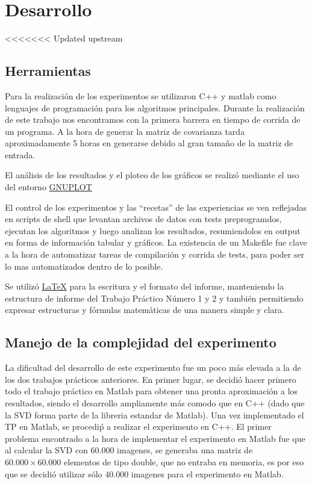 \section{Desarrollo}
<<<<<<< Updated upstream

\subsection{Herramientas}

Para la realizaci\'on de los experimentos se utilizaron C++ y matlab como lenguajes de
programaci\'on para los algoritmos principales. Durante la realizaci\'on de este trabajo nos encontramos con 
la primera barrera en tiempo de corrida de un programa. A la hora de generar la matriz de covarianza tarda
aproximadamente 5 horas en generarse debido al gran tama\~no de la matriz de entrada. 

El an\'alisis de los resultados y el ploteo de los gr\'aficos se realiz\'o
mediante el uso del entorno \href{http://www.gnuplot.info/}{GNUPLOT}

El control de los experimentos y las ``recetas'' de las experiencias se ven
reflejadas en scripts de shell que levantan archivos de datos con tests
preprogramdos, ejecutan los algoritmos y luego analizan los resultados,
resumiendolos en output en forma de informaci\'on tabular y gr\'aficos.
La existencia de un Makefile fue clave a la hora de automatizar tareas de
compilaci\'on y corrida de tests, para poder ser lo mas automatizados dentro de
lo posible.

Se utiliz\'o \href{http://www.latex-project.org/}{LaTeX} para la escritura y el formato del informe,
 manteniendo la estructura de informe del Trabajo Pr\'actico N\'umero 1 y 2 y tambi\'en
permitiendo expresar estructuras y f\'ormulas matem\'aticas de una manera simple y clara.

\subsection{Manejo de la complejidad del experimento}

La dificultad del desarrollo de este experimento fue un poco m\'as elevada a la de los dos 
trabajos pr\'acticos anteriores. 
En primer lugar, se decidi\'o hacer primero todo el trabajo pr\'actico en Matlab para obtener
una pronta aproximaci\'on a los resultados, siendo el desarrollo ampliamente m\'as comodo que
en C++ (dado que la SVD forma parte de la libreria estandar de Matlab). Una vez implementado
el TP en Matlab, se procedi\'p a realizar el experimento en C++. El primer problema encontrado
a la hora de implementar el experimento en Matlab fue que al calcular la SVD con 60.000 imagenes,
se generaba una matriz de $60.000 \times 60.000$ elementos de tipo double, que no entraba en
memoria, es por eso que se decidi\'o utilizar s\'olo 40.000 imagenes para el experimento en Matlab.

